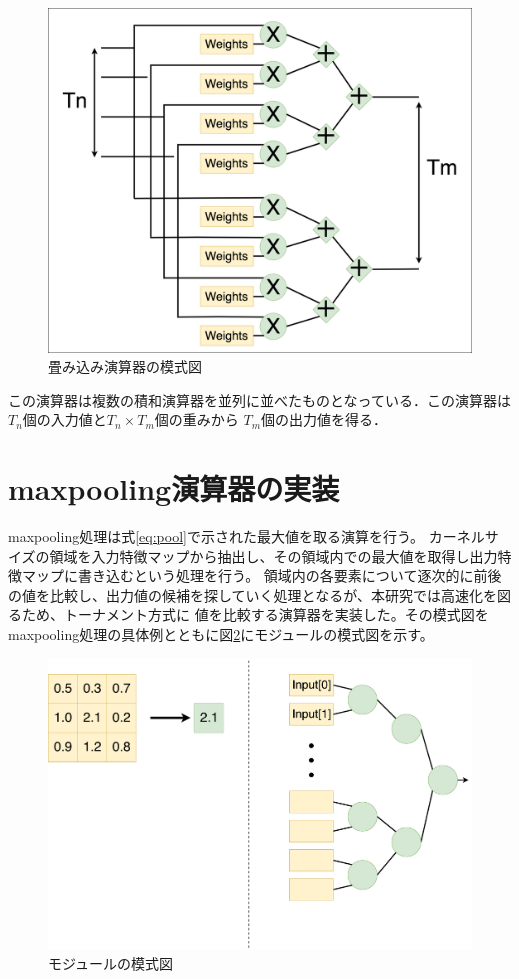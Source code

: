 {\begin{figure}[h]
    \centering
    \includegraphics[width=12cm]{./chap6/fig/ucla_pe.png}
    \caption{畳み込み演算器の模式図}
    \label{fig:conv_pe}
\end{figure}

この演算器は複数の積和演算器を並列に並べたものとなっている．この演算器は$T_n$個の入力値と$T_n \times T_m$個の重みから
$T_m$個の出力値を得る．
\section{maxpooling演算器の実装}
\label{sec:max_impl}
maxpooling処理は式\ref{eq:pool}で示された最大値を取る演算を行う。
カーネルサイズの領域を入力特徴マップから抽出し、その領域内での最大値を取得し出力特徴マップに書き込むという処理を行う。
領域内の各要素について逐次的に前後の値を比較し、出力値の候補を探していく処理となるが、本研究では高速化を図るため、トーナメント方式に
値を比較する演算器を実装した。その模式図をmaxpooling処理の具体例とともに図\ref{fig:maxpool_pe}にモジュールの模式図を示す。
\begin{figure}[h]
  \centering
  \includegraphics[width=12cm]{./chap6/fig/maxpool_pe.pdf}
  \caption{モジュールの模式図}
  \label{fig:maxpool_pe}
\end{figure}
}

